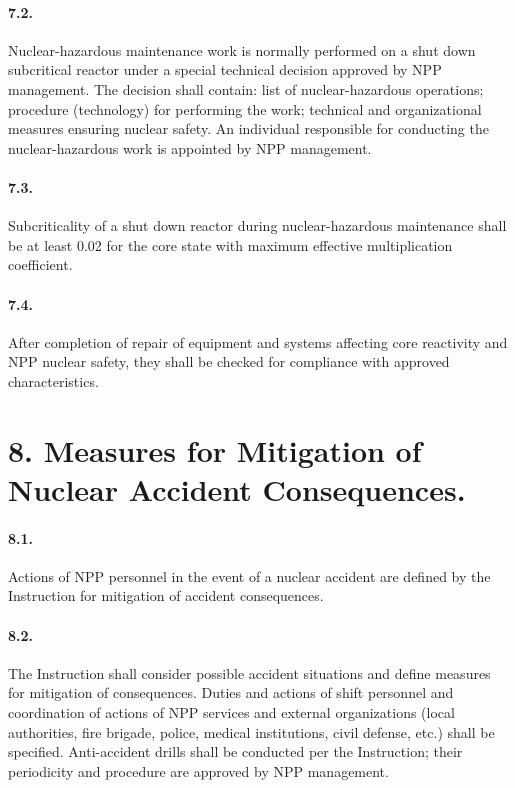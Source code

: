 \documentclass[openright]{bookest}
\begin{document}
\paragraph{7.2.} Nuclear-hazardous maintenance work is normally performed on a shut down subcritical reactor under a special technical decision approved by NPP management. The decision shall contain: list of nuclear-hazardous operations; procedure (technology) for performing the work; technical and organizational measures ensuring nuclear safety. An individual responsible for conducting the nuclear-hazardous work is appointed by NPP management.

\paragraph{7.3.} Subcriticality of a shut down reactor during nuclear-hazardous maintenance shall be at least \num{0.02} for the core state with maximum effective multiplication coefficient.

\paragraph{7.4.} After completion of repair of equipment and systems affecting core reactivity and NPP nuclear safety, they shall be checked for compliance with approved characteristics.

\section*{8. Measures for Mitigation of Nuclear Accident Consequences.}

\paragraph{8.1.} Actions of NPP personnel in the event of a nuclear accident are defined by the Instruction for mitigation of accident consequences.

\paragraph{8.2.} The Instruction shall consider possible accident situations and define measures for mitigation of consequences. Duties and actions of shift personnel and coordination of actions of NPP services and external organizations (local authorities, fire brigade, police, medical institutions, civil defense, etc.) shall be specified. Anti-accident drills shall be conducted per the Instruction; their periodicity and procedure are approved by NPP management.
\end{document}
